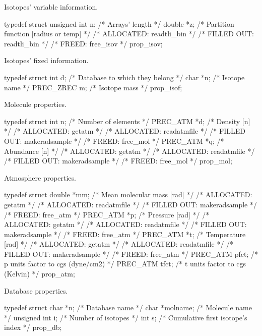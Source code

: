 \documentclass[letterpaper,12pt]{article}
\begin{document}
\noindent \newline
Isotopes' variable information.
\begin{plain}
typedef struct {    
  unsigned int n;   /* Arrays' length                                       */
  double *z;        /* Partition function [radius or temp]                  */
    /* ALLOCATED:	readtli_bin					    */
    /* FILLED OUT:	readtli_bin					    */
    /* FREED: 		free_isov						    */ 
} prop_isov;
\end{plain}
\noindent \newline
Isotopes' fixed information.
\begin{plain}
typedef struct {    
  int d;            /*  Database to which they belong */
  char *n;          /*  Isotope name                  */
  PREC_ZREC m;      /*  Isotope mass                  */
} prop_isof;
\end{plain}
\noindent \newline
Molecule properties.
\begin{plain}
typedef struct{   
  int n;           /*  Number of elements      */
  PREC_ATM *d;     /*  Density   [n]           */
    /* ALLOCATED:	getatm						    */
    /* ALLOCATED:	readatmfile					    */
    /* FILLED OUT:	makeradsample					    */
    /* FREED: 		free_mol					    */ 
  PREC_ATM *q;     /*  Abundance [n]           */
    /* ALLOCATED:	getatm						    */
    /* ALLOCATED:	readatmfile					    */
    /* FILLED OUT:	makeradsample					    */
    /* FREED: 		free\_mol					    */ 
} prop_mol;
\end{plain}
\noindent \newline
Atmosphere properties.
\begin{plain}
typedef struct {    
  double *mm;       /*  Mean molecular mass [rad]        */
    /* ALLOCATED:	getatm						    */
    /* ALLOCATED:	readatmfile					    */
    /* FILLED OUT:	makeradsample					    */
    /* FREED: 		free_atm					    */ 
  PREC_ATM *p;      /*  Pressure    [rad]                */
    /* ALLOCATED:	getatm						    */
    /* ALLOCATED:	readatmfile					    */
    /* FILLED OUT:	makeradsample					    */
    /* FREED: 		free_atm					    */ 
  PREC_ATM *t;      /*  Temperature [rad]                */
    /* ALLOCATED:	getatm						    */
    /* ALLOCATED:	readatmfile					    */
    /* FILLED OUT:	makeradsample					    */
    /* FREED: 		free_atm					    */ 
  PREC_ATM pfct;    /*  p units factor to cgs (dyne/cm2) */
  PREC_ATM tfct;    /*  t units factor to cgs (Kelvin)   */
} prop_atm;
\end{plain}
\noindent \newline
Database properties.
\begin{plain}
typedef struct {    
  char *n;          /*  Database name                                        */
  char *molname;    /*  Molecule name                                        */
  unsigned int i;   /*  Number of isotopes                                   */
  int s;            /*  Cumulative first isotope's index                     */
} prop_db;
\end{plain}
\end{document}
